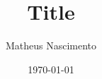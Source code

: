 \documentclass[a4papper,12pt]{article}
\begin{document}
\title{Title}
\author{Matheus Nascimento}
\date{\today}
\maketitle
\pagebreak

\begingroup
\let\clearpage\relax 					





\endgroup



\end{document}
